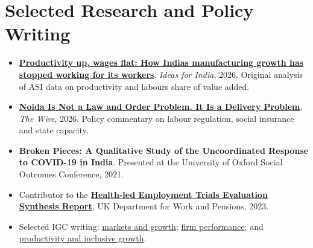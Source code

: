 \documentclass[10pt,a4paper]{article}
\newcommand{\link}[2]{\href{#1}{\color{teal}#2}}
\begin{document}
\section*{Selected Research and Policy Writing}
\begin{itemize}
  \item \textbf{\link{https://www.ideasforindia.in/topics/macroeconomics/productivity-up-wages-flat-how-indias-manufacturing-growth-has-stopped-working-for-its-workers}{Productivity up, wages flat: How India\textquotesingle s manufacturing growth has stopped working for its workers}}. \textit{Ideas for India}, 2026. Original analysis of ASI data on productivity and labour\textquotesingle s share of value added.
  \item \textbf{\link{https://m.thewire.in/article/labour/noida-is-not-a-law-and-order-problem-it-is-a-delivery-problem}{Noida Is Not a Law and Order Problem. It Is a Delivery Problem}}. \textit{The Wire}, 2026. Policy commentary on labour regulation, social insurance and state capacity.
  \item \textbf{Broken Pieces: A Qualitative Study of the Uncoordinated Response to COVID-19 in India}. Presented at the University of Oxford Social Outcomes Conference, 2021.
  \item Contributor to the \textbf{\link{https://www.gov.uk/government/publications/health-led-employment-trials-evaluation/health-led-trials-evaluation-synthesis-report}{Health-led Employment Trials Evaluation Synthesis Report}}, UK Department for Work and Pensions, 2023.
  \item Selected IGC writing: \link{https://www.theigc.org/blogs/how-can-markets-contribute-economic-growth-and-development}{markets and growth}; \link{https://www.theigc.org/blogs/performance-insights-firms-trade-conference}{firm performance}; and \link{https://www.theigc.org/blogs/firm-level-decisions-productivity-inclusive-growth}{productivity and inclusive growth}.
\end{itemize}
\end{document}
